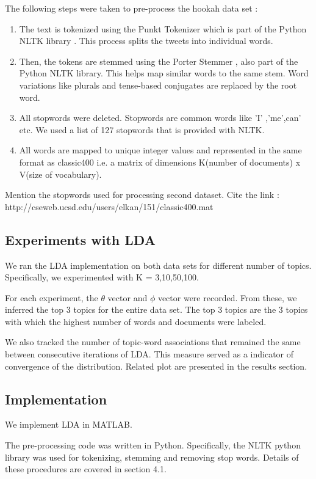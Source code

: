 \documentclass[11pt,a4paper,oneside]{article}
\begin{document}
The following steps were taken to pre-process the hookah data set : 

\begin{enumerate}
  \item The text is tokenized using the Punkt Tokenizer \cite{punkt} which is part of the Python NLTK library \cite{nltk}. This process splits the tweets into individual words.
  \item Then, the tokens are stemmed using the Porter Stemmer \cite{porter}, also part of the Python NLTK library. This helps map similar words to the same stem. Word variations like plurals and tense-based conjugates are replaced by the root word.
  \item All stopwords were deleted. Stopwords are common words like 'I' ,'me',can' etc. We used a list of 127 stopwords that is provided with NLTK\cite{nltk}.
  \item All words are mapped to unique integer values and represented in the same format as classic400 i.e. a matrix of dimensions K(number of documents) x V(size of vocabulary).
\end{enumerate}

Mention the stopwords used for processing second dataset.
Cite the link : http://cseweb.ucsd.edu/users/elkan/151/classic400.mat

\subsection{Experiments with LDA}
We ran the LDA implementation on both data sets for different number of topics. Specifically, we experimented with K = 3,10,50,100. 

For each experiment, the $\theta$ vector and $\phi$ vector were recorded. From these, we inferred the top 3 topics for the entire data set. The top 3 topics are the 3 topics with which the highest number of words and documents were labeled.

We also tracked the number of topic-word associations that remained the same between consecutive iterations of LDA. This measure served as a indicator of convergence of the distribution. Related plot are presented in the results section.

\subsection{Implementation}
We implement LDA in \textsc{MATLAB}.

The pre-processing code was written in Python. Specifically, the NLTK python library was used for tokenizing, stemming and removing stop words. Details of these procedures are covered in section 4.1.
\end{document}
